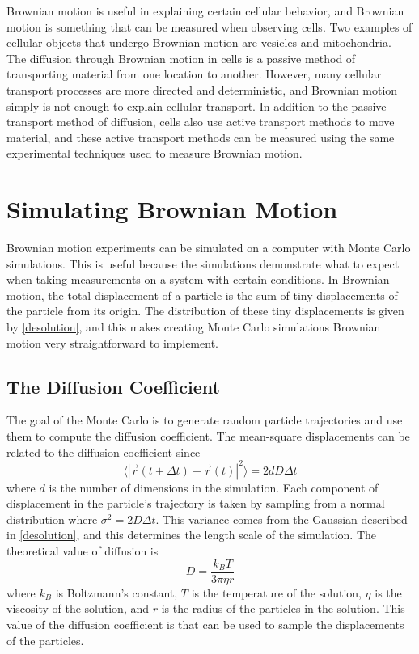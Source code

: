 \documentclass[11pt,letterpaper]{article}
\begin{document}
Brownian motion is useful in explaining certain cellular behavior, and Brownian
motion is something that can be measured when observing cells. Two examples of
cellular objects that undergo Brownian motion are vesicles and mitochondria. The
diffusion through Brownian motion in cells is a passive method of transporting
material from one location to another. However, many cellular transport
processes are more directed and deterministic, and Brownian motion simply is not
enough to explain cellular transport. In addition to the passive transport
method of diffusion, cells also use active transport methods to move material,
and these active transport methods can be measured using the same experimental
techniques used to measure Brownian motion.

\section{Simulating Brownian Motion}


Brownian motion experiments can be simulated on a computer with Monte Carlo
simulations. This is useful because the simulations demonstrate what to expect
when taking measurements on a system with certain conditions. In Brownian
motion, the total displacement of a particle is the sum of tiny displacements of
the particle from its origin. The distribution of these tiny displacements is
given by \eqref{desolution}, and this makes creating Monte Carlo simulations
Brownian motion very straightforward to implement.

\subsection{The Diffusion Coefficient}

The goal of the Monte Carlo is to generate random particle trajectories and use
them to compute the diffusion coefficient. The mean-square displacements can be
related to the diffusion coefficient since \cite{LabManual}
\begin{equation}
    \langle \left| \vec{r}\left(t + \Delta t\right) -
    \vec{r}\left(t\right) \right|^2 \rangle = 2dD\Delta t
    \label{diffusion_data}
\end{equation}
where $d$ is the number of dimensions in the simulation. Each component of
displacement in the particle's trajectory is taken by sampling from a normal
distribution where $\sigma^2 = 2 D \Delta t$. This variance comes from the
Gaussian described in \eqref{desolution}, and this determines the length scale
of the simulation. The theoretical value of diffusion is \cite{LabSim}
\begin{equation}
    D = \frac{k_B T}{3\pi\eta r}
    \label{diffusion_def}
\end{equation}
where $k_B$ is Boltzmann's constant, $T$ is the temperature of the solution,
$\eta$ is the viscosity of the solution, and $r$ is the radius of the particles
in the solution. This value of the diffusion coefficient is that can be used to
sample the displacements of the particles.\\
\end{document}
